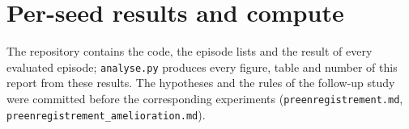 \documentclass[10pt,a4paper]{article}
\begin{document}
\section{Per-seed results and compute}

\begin{table}[h]
  \centering\small
  \caption{Outcome of the test episodes at $L=3$ (\% of 300 episodes).}
  \label{tab:outcomes}
  
\end{table}

\begin{table}[h]
  \centering\small
  \caption{Test success per seed (\%) and selected checkpoint.}
  \label{tab:seeds}
  
\end{table}

\begin{table}[h]
  \centering\small
  \caption{Diagnostics per seed at $L=3$ (protocol, 20k iterations; \%).}
  \label{tab:diagseeds}
  
\end{table}

\begin{table}[h]
  \centering\small
  \caption{Compute on RTX 5070 GPUs, measured per process; two or three conditions shared each GPU, so these figures overestimate GPU time.}
  \label{tab:compute}
  
\end{table}

\begin{sloppypar}
\noindent The repository contains the code, the episode lists and the result of every evaluated episode; \texttt{analyse.py} produces every figure, table and number of this report from these results. The hypotheses and the rules of the follow-up study were committed before the corresponding experiments (\texttt{preenregistrement.md}, \texttt{preenregistrement\_amelioration.md}).
\end{sloppypar}
\end{document}
